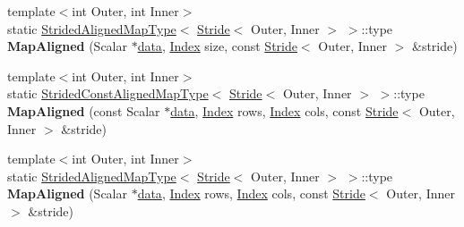 \begin{Indent}
\begin{DoxyCompactItemize}
\item 
\mbox{\label{class_eigen_1_1_plain_object_base_a2b1ce06138d53af1bb729ec1dab87e5a}} 
{\footnotesize template$<$int Outer, int Inner$>$ }\\static \hyperlink{struct_eigen_1_1_plain_object_base_1_1_strided_aligned_map_type}{Strided\+Aligned\+Map\+Type}$<$ \hyperlink{group___core___module_class_eigen_1_1_stride}{Stride}$<$ Outer, Inner $>$ $>$\+::type {\bfseries Map\+Aligned} (Scalar $\ast$\hyperlink{class_eigen_1_1_plain_object_base_ac25699535374b1854cf8494e44ad31b2}{data}, \hyperlink{namespace_eigen_a62e77e0933482dafde8fe197d9a2cfde}{Index} size, const \hyperlink{group___core___module_class_eigen_1_1_stride}{Stride}$<$ Outer, Inner $>$ \&stride)
\item 
\mbox{\label{class_eigen_1_1_plain_object_base_a48fbb5cbf164540617c5ca3e05afe953}} 
{\footnotesize template$<$int Outer, int Inner$>$ }\\static \hyperlink{struct_eigen_1_1_plain_object_base_1_1_strided_const_aligned_map_type}{Strided\+Const\+Aligned\+Map\+Type}$<$ \hyperlink{group___core___module_class_eigen_1_1_stride}{Stride}$<$ Outer, Inner $>$ $>$\+::type {\bfseries Map\+Aligned} (const Scalar $\ast$\hyperlink{class_eigen_1_1_plain_object_base_ac25699535374b1854cf8494e44ad31b2}{data}, \hyperlink{namespace_eigen_a62e77e0933482dafde8fe197d9a2cfde}{Index} rows, \hyperlink{namespace_eigen_a62e77e0933482dafde8fe197d9a2cfde}{Index} cols, const \hyperlink{group___core___module_class_eigen_1_1_stride}{Stride}$<$ Outer, Inner $>$ \&stride)
\item 
\mbox{\label{class_eigen_1_1_plain_object_base_af2ce47a0cde3943e528e00f2b191f7da}} 
{\footnotesize template$<$int Outer, int Inner$>$ }\\static \hyperlink{struct_eigen_1_1_plain_object_base_1_1_strided_aligned_map_type}{Strided\+Aligned\+Map\+Type}$<$ \hyperlink{group___core___module_class_eigen_1_1_stride}{Stride}$<$ Outer, Inner $>$ $>$\+::type {\bfseries Map\+Aligned} (Scalar $\ast$\hyperlink{class_eigen_1_1_plain_object_base_ac25699535374b1854cf8494e44ad31b2}{data}, \hyperlink{namespace_eigen_a62e77e0933482dafde8fe197d9a2cfde}{Index} rows, \hyperlink{namespace_eigen_a62e77e0933482dafde8fe197d9a2cfde}{Index} cols, const \hyperlink{group___core___module_class_eigen_1_1_stride}{Stride}$<$ Outer, Inner $>$ \&stride)

\end{DoxyCompactItemize}
\end{Indent}
